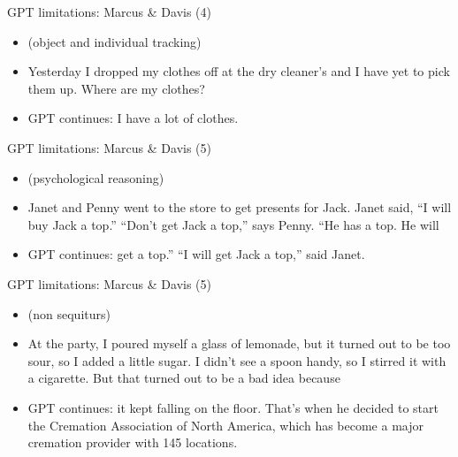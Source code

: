 \documentclass[11pt,compress,t,notes=noshow, xcolor=table]{beamer}
\begin{document}
\begin{frame}{GPT limitations: Marcus \& Davis (4)}

\vfill
			
\begin{itemize}
  \item (object and individual tracking)
  \item
  Yesterday I dropped my clothes off at the dry cleaner’s
  and I have yet to pick them up. Where are my clothes?

  \item
  GPT continues:
 I
  have a lot of clothes.

\end{itemize}

\vfill

\end{frame}


\begin{frame}{GPT limitations: Marcus \& Davis (5)}

\vfill

\begin{itemize}
  \item (psychological reasoning)
  \item
Janet and Penny went to the store to get presents for
Jack. Janet said, “I will buy Jack a top.” “Don’t get Jack a
top,” says Penny. “He has a top. He will
  \item
  GPT continues:
 get a top.” “I will
get Jack a top,” said Janet.


\end{itemize}

\vfill

\end{frame}


\begin{frame}{GPT limitations: Marcus \& Davis (5)}

\vfill

\begin{itemize}
  \item (non sequiturs)
  \item
At the party, I poured myself a glass of lemonade, but it
turned out to be too sour, so I added a little sugar. I
didn’t see a spoon handy, so I stirred it with a
cigarette. But that turned out to be a bad idea because

  \item
  GPT continues:
 it
kept falling on the floor. That’s when he decided to start
the Cremation Association of North America, which has become
a major cremation provider with 145 locations.


\end{itemize}

\vfill

\end{frame}
\end{document}
